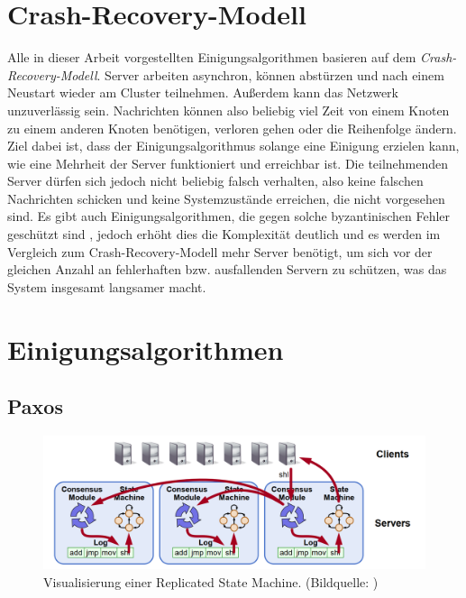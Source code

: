 \section{Crash-Recovery-Modell}

Alle in dieser Arbeit vorgestellten Einigungsalgorithmen basieren auf dem \textit{Crash-Recovery-Modell}. Server arbeiten asynchron, können abstürzen und nach einem Neustart wieder am Cluster teilnehmen. Außerdem kann das Netzwerk unzuverlässig sein. Nachrichten können also beliebig viel Zeit von einem Knoten zu einem anderen Knoten benötigen, verloren gehen oder die Reihenfolge ändern. Ziel dabei ist, dass der Einigungsalgorithmus solange eine Einigung erzielen kann, wie eine Mehrheit der Server funktioniert und erreichbar ist. Die teilnehmenden Server dürfen sich jedoch nicht beliebig falsch verhalten, also keine falschen Nachrichten schicken und keine Systemzustände erreichen, die nicht vorgesehen sind. Es gibt auch Einigungsalgorithmen, die gegen solche byzantinischen Fehler geschützt sind \cite{byzantine-paxos}, jedoch erhöht dies die Komplexität deutlich und es werden im Vergleich zum Crash-Recovery-Modell mehr Server benötigt, um sich vor der gleichen Anzahl an fehlerhaften bzw. ausfallenden Servern zu schützen, was das System insgesamt langsamer macht.

\section{Einigungsalgorithmen}
\label{algos}

\subsection{Paxos}

\begin{figure}[H]
	\centering
	\includegraphics[width=\linewidth]{img/state-machine.png}
	\caption{Visualisierung einer Replicated State Machine. (Bildquelle: \cite{raft-user-study})}
	\label{fig:replicated-state-machine}
\end{figure}

